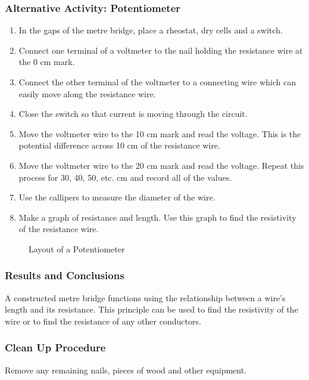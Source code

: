 \subsubsection{Alternative Activity: Potentiometer}
\begin{enumerate}
\item{In the gaps of the metre bridge, place a rheostat, dry cells and a switch.} 
\item{Connect one terminal of a voltmeter to the nail holding the resistance wire at the 0 cm mark.} 
\item{Connect the other terminal of the voltmeter to a connecting wire which can easily move along the resistance wire.} 
\item{Close the switch so that current is moving through the circuit.} 
\item{Move the voltmeter wire to the 10 cm mark and read the voltage. This is the potential difference across 10 cm of the resistance wire.} 
\item{Move the voltmeter wire to the 20 cm mark and read the voltage. Repeat this process for 30, 40, 50, etc. cm and record all of the values.} 
\item{Use the callipers to measure the diameter of the wire.} 
\item{Make a graph of resistance and length. Use this graph to find the resistivity of the resistance wire.} 
\end{enumerate}

\begin{figure}
\begin{center}
\def\svgwidth{300pt}

\caption{Layout of a Potentiometer}
\label{fig:potential-metre}
\end{center}
\end{figure}

\subsubsection*{Results and Conclusions}
A constructed metre bridge functions using the relationship between a wire's length and its resistance. This principle can be used to find the resistivity of the wire or to find the resistance of any other conductors.  

\subsubsection*{Clean Up Procedure}
Remove any remaining nails, pieces of wood and other equipment.

